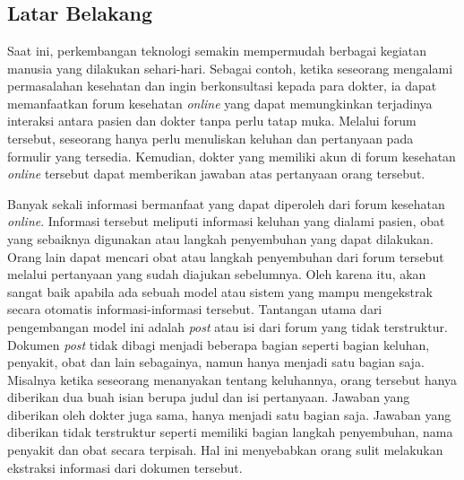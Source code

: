 \chapter{\babSatu}


\section{Latar Belakang}
	
	Saat ini, perkembangan teknologi semakin mempermudah berbagai kegiatan manusia yang dilakukan sehari-hari. Sebagai contoh, ketika seseorang mengalami permasalahan kesehatan dan ingin berkonsultasi kepada para dokter, ia dapat memanfaatkan forum kesehatan \textit{online} yang dapat memungkinkan terjadinya interaksi antara pasien dan dokter tanpa perlu tatap muka.  Melalui forum tersebut, seseorang hanya perlu menuliskan keluhan dan pertanyaan pada formulir yang tersedia. Kemudian, dokter yang memiliki akun di forum kesehatan \textit{online} tersebut dapat memberikan jawaban atas pertanyaan orang tersebut.
	
	Banyak sekali informasi bermanfaat yang dapat diperoleh dari forum kesehatan \textit{online}. Informasi tersebut meliputi informasi keluhan yang dialami pasien, obat yang sebaiknya digunakan atau langkah penyembuhan yang dapat dilakukan. Orang lain dapat mencari obat atau langkah penyembuhan dari forum tersebut melalui pertanyaan yang sudah diajukan sebelumnya. Oleh karena itu, akan sangat baik apabila ada sebuah model atau sistem yang mampu mengekstrak secara otomatis informasi-informasi tersebut. Tantangan utama dari pengembangan model ini adalah \textit{post} atau isi dari forum yang tidak terstruktur. Dokumen \textit{post} tidak dibagi menjadi beberapa bagian seperti bagian keluhan, penyakit, obat dan lain sebagainya, namun hanya menjadi satu bagian saja. Misalnya ketika seseorang menanyakan tentang keluhannya, orang tersebut hanya diberikan dua buah isian berupa judul dan isi pertanyaan. Jawaban yang diberikan oleh dokter juga sama, hanya menjadi satu bagian saja. Jawaban yang diberikan tidak terstruktur seperti memiliki bagian langkah penyembuhan, nama penyakit dan obat secara terpisah. Hal ini menyebabkan orang sulit melakukan ekstraksi informasi dari dokumen tersebut.
	
